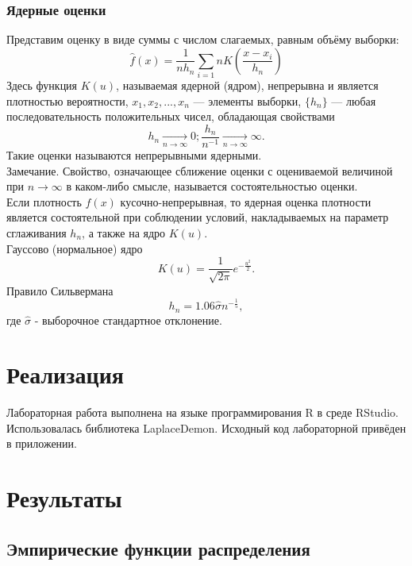 \subsubsection{Ядерные оценки}
Представим оценку в виде суммы с числом слагаемых, равным объёму выборки:
\begin{equation}\label{ker2}
\widehat{f}(x)=\frac{1}{n h_n} \sum_{i=1}{n} K(\frac{x - x_i}{h_n})
\end{equation}
Здесь функция \(K(u)\), называемая ядерной (ядром), непрерывна и является плотностью вероятности,  \(x_1, x_2, ..., x_n\) — элементы выборки, \(\{h_n\}\) — любая последовательность положительных чисел, обладающая свойствами
\begin{equation}\label{ker3}
h_{n} \xrightarrow[n \to \infty]{} 0;  \frac{h_{n}}{n^{-1}} \xrightarrow[n \to \infty]{} \infty.
\end{equation}
Такие оценки называются непрерывными ядерными.\\
Замечание. Свойство, означающее сближение оценки с оцениваемой величиной при \(n\to\infty\) в каком-либо смысле, называется состоятельностью оценки.\\
Если плотность \(f(x)\) кусочно-непрерывная, то ядерная оценка плотности является состоятельной при соблюдении условий, накладываемых на параметр сглаживания \(h_n\), а также на ядро \(K(u)\).\\
Гауссово (нормальное) ядро
\begin{equation}\label{ker4}
K(u)=\frac{1}{\sqrt{2\pi}}e^{-\frac{u^2}{2}}.
\end{equation}
Правило Сильвермана
\begin{equation}\label{ker5}
h_n=1.06\widehat{\sigma}n^{-\frac{1}{5}},
\end{equation}
где \(\widehat{\sigma}\) - выборочное стандартное отклонение.


\section{Реализация}
Лабораторная работа выполнена на языке программирования R в среде RStudio. Использовалась библиотека LaplaceDemon. Исходный код лабораторной привёден в приложении.



\section{Результаты}
\subsection{Эмпирические функции распределения}

